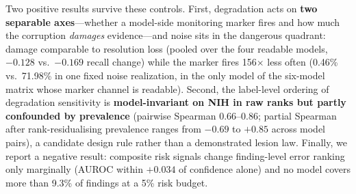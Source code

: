 Two positive results survive these controls. First, degradation acts on \textbf{two separable axes}---whether a model-side monitoring marker fires and how much the corruption \emph{damages} evidence---and noise sits in the dangerous quadrant: damage comparable to resolution loss (pooled over the four readable models, $-0.128$ vs.\ $-0.169$ recall change) while the marker fires 156$\times$ less often (0.46\% vs.\ 71.98\% in one fixed noise realization, in the only model of the six-model matrix whose marker channel is readable). Second, the label-level ordering of degradation sensitivity is \textbf{model-invariant on NIH in raw ranks but partly confounded by prevalence} (pairwise Spearman 0.66--0.86; partial Spearman after rank-residualising prevalence ranges from $-0.69$ to $+0.85$ across model pairs), a candidate design rule rather than a demonstrated lesion law. Finally, we report a negative result: composite risk signals change finding-level error ranking only marginally (AUROC within $+0.034$ of confidence alone) and no model covers more than 9.3\% of findings at a 5\% risk budget.


